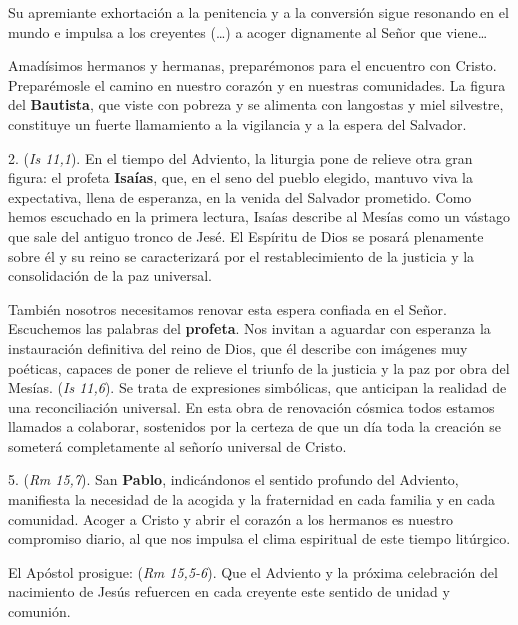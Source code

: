 \begin{body}
\begin{body}
	Su apremiante exhortación a la penitencia y a la conversión sigue resonando en el mundo e impulsa a los creyentes (\ldots{}) a acoger dignamente al Señor que viene\ldots{}
	
	Amadísimos hermanos y hermanas, preparémonos para el encuentro con Cristo. Preparémosle el camino en nuestro corazón y en nuestras comunidades. La figura del \textbf{Bautista}, que viste con pobreza y se alimenta con langostas y miel silvestre, constituye un fuerte llamamiento a la vigilancia y a la espera del Salvador.
	
	2.  (\emph{Is 11,1}). En el tiempo del Adviento, la liturgia pone de relieve otra gran figura: el profeta \textbf{Isaías}, que, en el seno del pueblo elegido, mantuvo viva la expectativa, llena de esperanza, en la venida del Salvador prometido. Como hemos escuchado en la primera lectura, Isaías describe al Mesías como un vástago que sale del antiguo tronco de Jesé. El Espíritu de Dios se posará plenamente sobre él y su reino se caracterizará por el restablecimiento de la justicia y la consolidación de la paz universal.
	
	También nosotros necesitamos renovar esta espera confiada en el Señor. Escuchemos las palabras del \textbf{profeta}. Nos invitan a aguardar con esperanza la instauración definitiva del reino de Dios, que él describe con imágenes muy poéticas, capaces de poner de relieve el triunfo de la justicia y la paz por obra del Mesías.  (\emph{Is 11,6}). Se trata de expresiones simbólicas, que anticipan la realidad de una reconciliación universal. En esta obra de renovación cósmica todos estamos llamados a colaborar, sostenidos por la certeza de que un día toda la creación se someterá completamente al señorío universal de Cristo.
	
	5.  (\emph{Rm 15,7}). San \textbf{Pablo}, indicándonos el sentido profundo del Adviento, manifiesta la necesidad de la acogida y la fraternidad en cada familia y en cada comunidad. Acoger a Cristo y abrir el corazón a los hermanos es nuestro compromiso diario, al que nos impulsa el clima espiritual de este tiempo litúrgico.
	
	El Apóstol prosigue:  (\emph{Rm 15,5-6}). Que el Adviento y la próxima celebración del nacimiento de Jesús refuercen en cada creyente este sentido de unidad y comunión.
	

\end{body}
\end{body}
